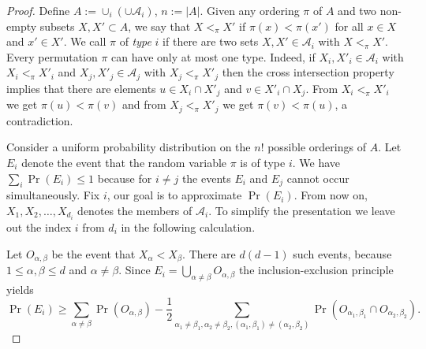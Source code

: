 \documentclass[12pt,a4paper]{amsart}
\numberwithin{equation}{section}
\theoremstyle{plain}
\theoremstyle{definition}
\newcommand{\m}{\mathcal}
\newcommand{\adam}[1]{{\color{cyan}[{ \textbf{Ádám:}  #1}]\marginpar{\color{cyan}*}}}
\newcommand{\NN}{n}
\def\cA{{\mathcal{A}}}
\begin{document}
\begin{proof}
Define $A:= \cup_i (\cup \cA_i)$, $\NN:= |A|$.
Given any ordering $\pi$ of $A$ and two non-empty subsets $X,X' \subset A$, we say that $X<_\pi X'$ if $\pi(x)<\pi(x')$ for all $x \in X$ and $x' \in X'$.
We call $\pi$ of {\em type} $i$ if there are two sets $X, X' \in \mathcal{A}_i$ with $X <_\pi X'$.
Every permutation $\pi$ can have only at most one type. Indeed,
if $X_i, X'_i \in \m{A}_i$ with $X_i <_\pi X'_i$ and $X_j, X'_j \in \m{A}_j$ with $X_j<_\pi X'_j$ then the cross intersection property implies that there are  elements $u \in X_i \cap X'_j$ and $v \in X'_i \cap X_j$. From $X_i<_\pi X'_i$ we get $\pi(u)<\pi(v)$ and from $X_j<_\pi X'_j$ we get $\pi(v)<\pi(u)$, a contradiction.

Consider a uniform probability distribution on the $n!$ possible orderings of $A$.
Let $E_i$ denote the event that the random variable $\pi$ is of type $i$.
We have $\sum_{i} \Pr(E_i)\leq 1$ because for $i \neq j$ the events $E_i$ and $E_j$ cannot occur simultaneously.
Fix $i$, our goal is to approximate $\Pr(E_i)$.
From now on, $X_1,X_2,\ldots, X_{d_i}$ denotes the members of $\mathcal{A}_i$.
To simplify the presentation we leave out the index $i$ from $d_i$ in the following calculation.


Let $O_{\alpha,\beta}$ be the event that $X_\alpha<X_\beta $. There are $d(d-1)$ such events, because $1 \leq \alpha,\beta \leq d$ and $\alpha \neq \beta$. Since $E_i=\bigcup_{\alpha\not=\beta}O_{\alpha,\beta}$ the inclusion-exclusion principle yields
$$\Pr(E_i)\geq\sum_{\alpha\not=\beta}\Pr(O_{\alpha,\beta})-\frac{1}{2}\sum_{\alpha_1\not=\beta_1,\alpha_2\not=\beta_2,(\alpha_1,\beta_1)\not=(\alpha_2,\beta_2)}\Pr(O_{\alpha_1,\beta_1}\cap O_{\alpha_2,\beta_2}).$$


\end{proof}
\end{document}
